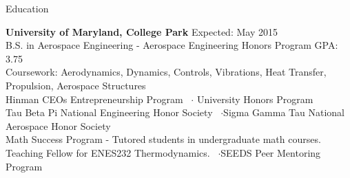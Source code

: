 \documentclass{resume} %
\begin{document}

\begin{rSection}{Education}

{\bf University of Maryland, College Park} \hfill { Expected: May 2015} \\
B.S. in Aerospace Engineering - Aerospace Engineering Honors Program \hfill {GPA: 3.75} \\
Coursework: Aerodynamics, Dynamics, Controls, Vibrations, Heat Transfer, Propulsion, Aerospace Structures\\
Hinman CEOs Entrepreneurship Program ~$\cdot$ University Honors Program \\
Tau Beta Pi National Engineering Honor Society ~$\cdot$Sigma Gamma Tau National Aerospace Honor Society\\
Math Success Program - Tutored students in undergraduate math courses. \\
Teaching Fellow for ENES232 Thermodynamics. ~$\cdot$SEEDS Peer Mentoring Program \\
\end{rSection}

\end{document}
